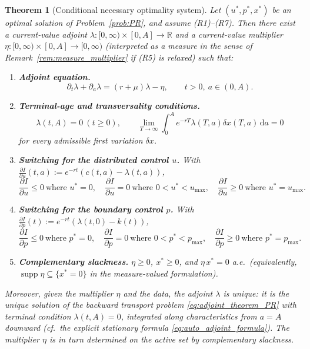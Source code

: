 \documentclass[pdflatex,sn-mathphys-num]{sn-jnl}
\newtheorem{theorem}{Theorem}[section]
\theoremstyle{definition}
\theoremstyle{remark}
\newcommand{\R}{\mathbb{R}}
\newcommand{\dd}{\,\mathrm{d}}
\begin{document}
\begin{theorem}[Conditional necessary optimality system]
\label{thm:necessary_PR}
Let $(u^\ast,p^\ast,x^\ast)$ be an optimal solution of
Problem~\ref{prob:PR}, and assume \textup{(R1)--(R7)}. Then there exist a
current-value adjoint $\lambda:[0,\infty)\times[0,A]\to\R$ and a current-value
multiplier $\eta:[0,\infty)\times[0,A]\to[0,\infty)$ (interpreted as a
measure in the sense of Remark~\ref{rem:measure_multiplier} if (R5) is
relaxed) such that:
\begin{enumerate}[leftmargin=2.6em]
    \item[\textup{(i)}] \textbf{Adjoint equation.}
    \begin{equation}\label{eq:adjoint_theorem_PR}
    \partial_t\lambda+\partial_a\lambda=(r+\mu)\lambda-\eta,
    \qquad t>0,\ a\in(0,A).
    \end{equation}
    \item[\textup{(ii)}] \textbf{Terminal-age and transversality conditions.}
    \begin{equation}\label{eq:adjoint_terminal_theorem_PR}
    \lambda(t,A)=0\ (t\ge0),\qquad
    \lim_{T\to\infty}\int_0^A e^{-rT}\lambda(T,a)\delta x(T,a)\dd a=0
    \end{equation}
    for every admissible first variation $\delta x$.
    \item[\textup{(iii)}] \textbf{Switching for the distributed control $u$.}
    With $\frac{\partial I}{\partial u}(t,a):=e^{-rt}(c(t,a)-\lambda(t,a))$,
    \begin{equation}\label{eq:u_switch}
    \frac{\partial I}{\partial u}\le0\ \text{where }u^\ast=0,\quad
    \frac{\partial I}{\partial u}=0\ \text{where }0<u^\ast<u_{\max},\quad
    \frac{\partial I}{\partial u}\ge0\ \text{where }u^\ast=u_{\max}.
    \end{equation}
    \item[\textup{(iv)}] \textbf{Switching for the boundary control $p$.}
    With $\frac{\partial I}{\partial p}(t):=e^{-rt}(\lambda(t,0)-k(t))$,
    \begin{equation}\label{eq:p_switch}
    \frac{\partial I}{\partial p}\le0\ \text{where }p^\ast=0,\quad
    \frac{\partial I}{\partial p}=0\ \text{where }0<p^\ast<p_{\max},\quad
    \frac{\partial I}{\partial p}\ge0\ \text{where }p^\ast=p_{\max}.
    \end{equation}
    \item[\textup{(v)}] \textbf{Complementary slackness.}
    $\eta\ge0$, $x^\ast\ge0$, and $\eta\,x^\ast=0$ a.e.\ (equivalently,
    $\operatorname{supp}\eta\subseteq\{x^\ast=0\}$ in the measure-valued
    formulation).
\end{enumerate}
Moreover, given the multiplier $\eta$ and the data, the adjoint $\lambda$ is
\emph{unique}: it is the unique solution of the backward transport problem
\eqref{eq:adjoint_theorem_PR} with terminal condition
$\lambda(t,A)=0$, integrated along characteristics from $a=A$ downward
(cf.\ the explicit stationary formula \eqref{eq:auto_adjoint_formula}). The
multiplier $\eta$ is in turn determined on the active set by complementary
slackness.
\end{theorem}
\end{document}
